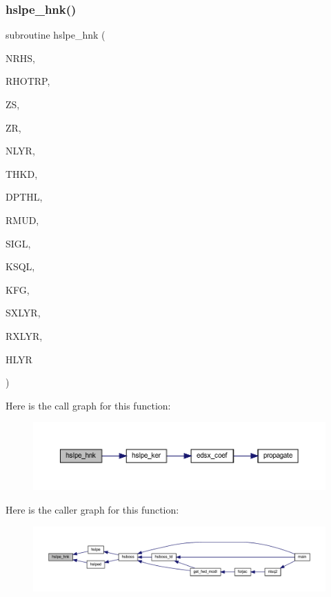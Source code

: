 \subsubsection{\texorpdfstring{hslpe\+\_\+hnk()}{hslpe\_hnk()}}
{\footnotesize\ttfamily subroutine hslpe\+\_\+hnk (\begin{DoxyParamCaption}\item[{integer}]{N\+R\+HS,  }\item[{real, dimension(nrhs)}]{R\+H\+O\+T\+RP,  }\item[{real(kind=ql)}]{ZS,  }\item[{real(kind=ql)}]{ZR,  }\item[{integer}]{N\+L\+YR,  }\item[{real(kind=ql), dimension (nlyr)}]{T\+H\+KD,  }\item[{real(kind=ql), dimension (nlyr)}]{D\+P\+T\+HL,  }\item[{real(kind=ql), dimension(0\+:nlyr)}]{R\+M\+UD,  }\item[{complex(kind=ql), dimension (nlyr)}]{S\+I\+GL,  }\item[{complex(kind=ql), dimension (nlyr)}]{K\+S\+QL,  }\item[{integer}]{K\+FG,  }\item[{integer}]{S\+X\+L\+YR,  }\item[{integer}]{R\+X\+L\+YR,  }\item[{complex, dimension(nrhs,3)}]{H\+L\+YR }\end{DoxyParamCaption})}

Here is the call graph for this function\+:\nopagebreak
\begin{figure}[H]
\begin{center}
\leavevmode
\includegraphics[width=350pt]{Leroi_8f90_adae61b12e3735bac162cd8f39a3607d3_cgraph}
\end{center}
\end{figure}
Here is the caller graph for this function\+:\nopagebreak
\begin{figure}[H]
\begin{center}
\leavevmode
\includegraphics[width=350pt]{Leroi_8f90_adae61b12e3735bac162cd8f39a3607d3_icgraph}
\end{center}
\end{figure}
\mbox{\label{Leroi_8f90_ae58b6750741316da9a6a86b44785fa58}} 
